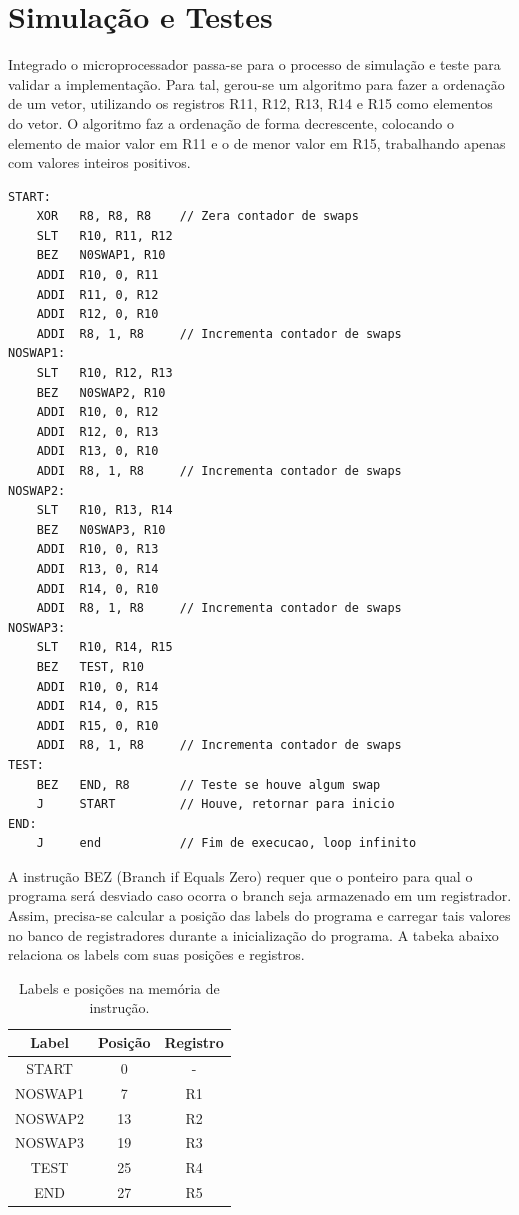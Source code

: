 \documentclass[11pt,a4paper,titlepage]{article}
\begin{document}
\section{Simulação e Testes}

Integrado o microprocessador passa-se para o processo de simulação e teste para validar a implementação. Para tal, gerou-se um algoritmo para fazer a ordenação de um vetor, utilizando os registros R11, R12, R13, R14 e R15 como elementos do vetor. O algoritmo faz a ordenação de forma decrescente, colocando o elemento de maior valor em R11 e o de menor valor em R15, trabalhando apenas com valores inteiros positivos.

\lstset{language=[mips]Assembler}
\begin{lstlisting}
START:
    XOR   R8, R8, R8    // Zera contador de swaps
    SLT   R10, R11, R12   
    BEZ   N0SWAP1, R10
    ADDI  R10, 0, R11
    ADDI  R11, 0, R12
    ADDI  R12, 0, R10
    ADDI  R8, 1, R8     // Incrementa contador de swaps
NOSWAP1:
    SLT   R10, R12, R13
    BEZ   N0SWAP2, R10
    ADDI  R10, 0, R12
    ADDI  R12, 0, R13
    ADDI  R13, 0, R10
    ADDI  R8, 1, R8     // Incrementa contador de swaps
NOSWAP2:
    SLT   R10, R13, R14
    BEZ   N0SWAP3, R10
    ADDI  R10, 0, R13
    ADDI  R13, 0, R14
    ADDI  R14, 0, R10
    ADDI  R8, 1, R8     // Incrementa contador de swaps
NOSWAP3:
    SLT   R10, R14, R15
    BEZ   TEST, R10
    ADDI  R10, 0, R14
    ADDI  R14, 0, R15
    ADDI  R15, 0, R10
    ADDI  R8, 1, R8     // Incrementa contador de swaps
TEST:
    BEZ   END, R8       // Teste se houve algum swap
    J     START         // Houve, retornar para inicio
END:
    J     end           // Fim de execucao, loop infinito
\end{lstlisting}

A instrução BEZ (Branch if Equals Zero) requer que o ponteiro para qual o programa será desviado caso ocorra o branch seja armazenado em um registrador. Assim, precisa-se calcular a posição das labels do programa e carregar tais valores no banco de registradores durante a inicialização do programa. A tabeka abaixo relaciona os labels com suas posições e registros.

\begin{table}[h]
\centering
\begin{tabular}{| c | c | c |}
\hline
Label & Posição & Registro\\
\hline
START & 0 & -\\
\hline
NOSWAP1 & 7 & R1\\
\hline
NOSWAP2 & 13 & R2\\
\hline
NOSWAP3 & 19 & R3\\
\hline
TEST & 25 & R4\\
\hline
END & 27 & R5\\
\hline
\end{tabular}
\caption{Labels e posições na memória de instrução.}
\label{tab:labels}
\end{table}
%
\end{document}
